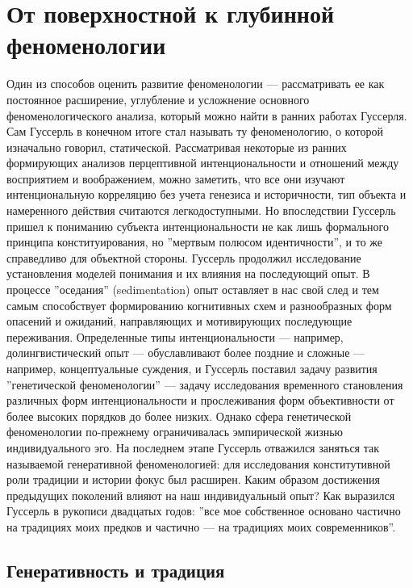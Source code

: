 \documentclass[11pt]{book}
\begin{document}
\chapter{От поверхностной к глубинной феноменологии}

Один из способов оценить развитие феноменологии --- рассматривать ее как постоянное расширение, углубление и усложнение основного феноменологического анализа, который можно найти в ранних работах Гуссерля. Сам Гуссерль в конечном итоге стал называть ту феноменологию, о которой изначально говорил, статической. Рассматривая некоторые из ранних формирующих анализов перцептивной интенциональности и отношений между восприятием и воображением, можно заметить, что все они изучают интенциональную корреляцию без учета генезиса и историчности, тип объекта и намеренного действия считаются легкодоступными. Но впоследствии Гуссерль пришел к пониманию субъекта интенциональности не как лишь формального принципа конституирования, но ''мертвым полюсом идентичности'', и то же справедливо для объектной стороны. Гуссерль продолжил исследование установления моделей понимания и их влияния на последующий опыт. В процессе ''оседания'' (sedimentation) опыт оставляет в нас свой след и тем самым способствует формированию когнитивных схем и разнообразных форм опасений и ожиданий, направляющих и мотивирующих последующие переживания. Определенные типы интенциональности --- например, долингвистический опыт --- обуславливают более поздние и сложные --- например, концептуальные суждения, и Гуссерль поставил задачу развития ''генетической феноменологии'' --- задачу исследования временного становления различных форм интенциональности и прослеживания форм объективности от более высоких порядков до более низких. Однако сфера генетической феноменологии по-прежнему ограничивалась эмпирической жизнью индивидуального эго. На последнем этапе Гуссерль отважился заняться так называемой генеративной феноменологией: для исследования конститутивной роли традиции и истории фокус был расширен. Каким образом достижения предыдущих поколений влияют на наш индивидуальный опыт? Как выразился Гуссерль в рукописи двадцатых годов: ''все мое собственное основано частично на традициях моих предков и частично --- на традициях моих современников''.

\section{Генеративность и традиция}
\end{document}
